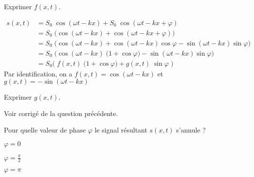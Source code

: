 
\begin{enonce}
Exprimer $f\left(x,t\right)$.
\end{enonce}


\begin{corrige}
	\begin{align*}
		s\left(x,t\right) & = S_0 \; \cos \left(\omega t - k x\right) + S_0 \; \cos \left(\omega t - k x + \varphi\right) \\
		& = S_0 \; \big( \cos \left(\omega t - k x\right) + \cos \left(\omega t - k x + \varphi\right) \big)\\
		& = S_0 \; \big( \cos \left(\omega t - k x\right) + \cos \left(\omega t - k x\right)\cos \varphi - \sin \left(\omega t - k x\right)\sin \varphi \big)\\
		& = S_0 \; \big( \cos \left(\omega t - k x\right) \; \big(1 +\cos \varphi \big) - \sin \left(\omega t - k x\right)\sin \varphi \big)\\
		& = S_0 \big( \; f\left(x,t\right)\; \big( 1+\cos \varphi \big) + g\left(x,t\right) \; \sin \varphi \; \big)
	 \end{align*}
Par identification, on a $f\left(x,t\right)=\cos \left(\omega t - k x\right)$ et $g\left(x,t\right)=-\sin \left(\omega t - k x\right)$
\end{corrige}




\begin{enonce}
Exprimer $g\left(x,t\right)$.
\end{enonce}


\begin{corrige}
Voir corrigé de la question précédente.
\end{corrige}



\vspace*{0.4cm}
\begin{enonce}
	Pour quelle valeur de phase $\varphi$ le signal résultant $s\left(x,t\right)$ s'annule ? 
	
	\begin{listeQCM3Colonnes}
	\item $\varphi=0$
	\item $\varphi=\frac{\pi}{2}$
	\item $\varphi=\pi$
	\end{listeQCM3Colonnes}

\end{enonce}

